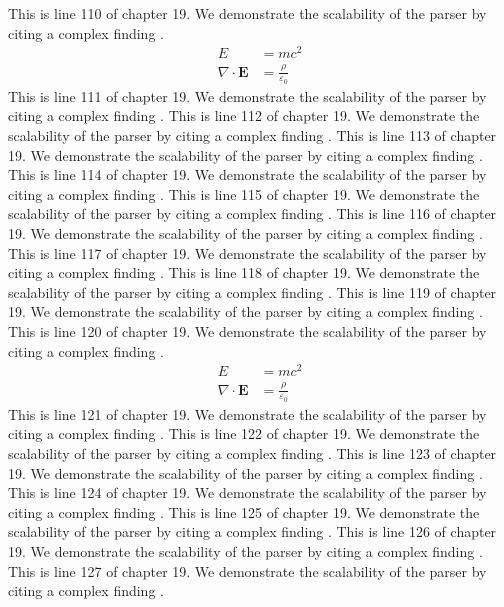 This is line 110 of chapter 19. We demonstrate the scalability of the parser by citing a complex finding \cite{ref19_110}.
\begin{align*}
  E &= mc^2 \\
  \nabla \cdot \mathbf{E} &= \frac{\rho}{\varepsilon_0}
\end{align*}
This is line 111 of chapter 19. We demonstrate the scalability of the parser by citing a complex finding \cite{ref19_111}.
This is line 112 of chapter 19. We demonstrate the scalability of the parser by citing a complex finding \cite{ref19_112}.
This is line 113 of chapter 19. We demonstrate the scalability of the parser by citing a complex finding \cite{ref19_113}.
This is line 114 of chapter 19. We demonstrate the scalability of the parser by citing a complex finding \cite{ref19_114}.
This is line 115 of chapter 19. We demonstrate the scalability of the parser by citing a complex finding \cite{ref19_115}.
This is line 116 of chapter 19. We demonstrate the scalability of the parser by citing a complex finding \cite{ref19_116}.
This is line 117 of chapter 19. We demonstrate the scalability of the parser by citing a complex finding \cite{ref19_117}.
This is line 118 of chapter 19. We demonstrate the scalability of the parser by citing a complex finding \cite{ref19_118}.
This is line 119 of chapter 19. We demonstrate the scalability of the parser by citing a complex finding \cite{ref19_119}.
This is line 120 of chapter 19. We demonstrate the scalability of the parser by citing a complex finding \cite{ref19_120}.
\begin{align*}
  E &= mc^2 \\
  \nabla \cdot \mathbf{E} &= \frac{\rho}{\varepsilon_0}
\end{align*}
This is line 121 of chapter 19. We demonstrate the scalability of the parser by citing a complex finding \cite{ref19_121}.
This is line 122 of chapter 19. We demonstrate the scalability of the parser by citing a complex finding \cite{ref19_122}.
This is line 123 of chapter 19. We demonstrate the scalability of the parser by citing a complex finding \cite{ref19_123}.
This is line 124 of chapter 19. We demonstrate the scalability of the parser by citing a complex finding \cite{ref19_124}.
This is line 125 of chapter 19. We demonstrate the scalability of the parser by citing a complex finding \cite{ref19_125}.
This is line 126 of chapter 19. We demonstrate the scalability of the parser by citing a complex finding \cite{ref19_126}.
This is line 127 of chapter 19. We demonstrate the scalability of the parser by citing a complex finding \cite{ref19_127}.
